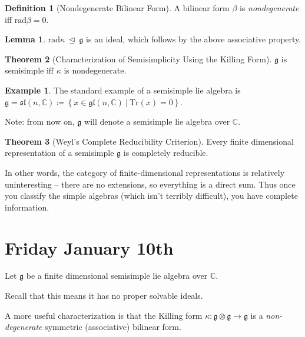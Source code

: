 \documentclass[11pt]{scrartcl}
\theoremstyle{definition}
\theoremstyle{theorem}
\newtheorem{theorem}{Theorem}[section]
\newtheorem{lemma}[theorem]{Lemma}
\theoremstyle{proof}
\theoremstyle{definition}
\newtheorem{definition}{Definition}[theorem]
\theoremstyle{break}
\newtheorem{example}{Example}[section]
\theoremstyle{problem}
\newcommand{\CC}[0]{{\mathbb{C}}}
\newcommand{\definedas}[0]{\coloneqq}
\newcommand{\liegl}[0]{{\mathfrak{gl}}}
\newcommand{\lieg}[0]{{\mathfrak{g}}}
\newcommand{\liesl}[0]{{\mathfrak{sl}}}
\newcommand{\normal}[0]{{~\trianglelefteq~}}
\newcommand{\suchthat}[0]{{~\mathrel{\Big|}~}}
\newcommand{\tensor}[0]{\otimes}
\newcommand{\theset}[1]{\left\{{#1}\right\}}
\newcommand{\tr}[0]{\mathrm{Tr}}
\renewcommand{\to}[0]{\longrightarrow}
\begin{document}
\begin{definition}[Nondegenerate Bilinear Form]

A bilinear form \(\beta\) is \emph{nondegenerate} iff
\(\mathrm{rad}\beta = 0\).\end{definition}

\begin{lemma}

\(\mathrm{rad}\kappa \normal \lieg\) is an ideal, which follows by the
above associative property.\end{lemma}

\begin{theorem}[Characterization of Semisimplicity Using the Killing Form]

\(\lieg\) is semisimple iff \(\kappa\) is nondegenerate.\end{theorem}

\begin{example}

The standard example of a semisimple lie algebra is
\(\lieg = \liesl(n, \CC) \definedas \theset{x\in \liegl(n, \CC) \suchthat \tr(x) = 0 }\).\end{example}

Note: from now on, \(\lieg\) will denote a semisimple lie algebra over
\(\CC\).

\begin{theorem}[Weyl’s Complete Reducibility Criterion]

Every finite dimensional representation of a semisimple \(\lieg\) is
completely reducible.\end{theorem}

In other words, the category of finite-dimensional representations is
relatively uninteresting -- there are no extensions, so everything is a
direct sum. Thus once you classify the simple algebras (which isn't
terribly difficult), you have complete information.

\hypertarget{friday-january-10th}{%
\section{Friday January 10th}\label{friday-january-10th}}

Let \(\lieg\) be a finite dimensional semisimple lie algebra over
\(\CC\).

Recall that this means it has no proper solvable ideals.

A more useful characterization is that the Killing form
\(\kappa: \lieg\tensor \lieg \to \lieg\) is a \emph{non-degenerate}
symmetric (associative) bilinear form.
\end{document}
